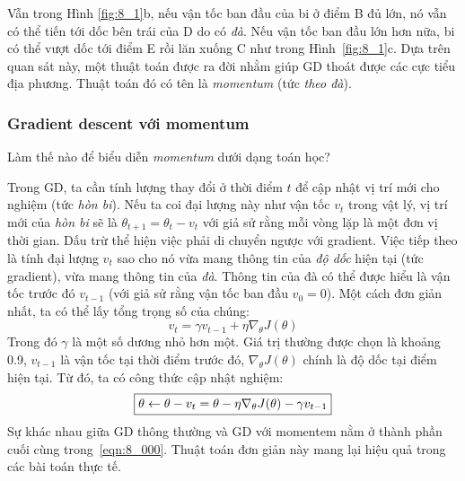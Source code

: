 Vẫn trong Hình \ref{fig:8_1}b, nếu vận tốc ban đầu của bi ở điểm B đủ lớn, nó
vẫn có thể tiến tới dốc bên trái của D do có \textit{đà}. Nếu vận tốc
ban đầu lớn hơn nữa, bi có thể vượt dốc tới điểm E rồi lăn xuống C như trong
Hình~\ref{fig:8_1}c. Dựa trên quan sát này, một thuật toán được ra đời nhằm giúp
GD thoát được các cực tiểu địa phương. Thuật toán đó có tên là \textit{momentum}
(tức \textit{theo đà}).

\subsubsection{Gradient descent với momentum}
Làm thế nào để biểu diễn \textit{momentum} dưới dạng toán học?

Trong GD, ta cần tính lượng thay đổi ở thời điểm $t$ để cập nhật vị trí
mới cho nghiệm (tức \textit{hòn bi}). Nếu ta coi đại lượng này như vận tốc
$v_t$ trong vật lý, vị trí mới của \textit{hòn bi} sẽ là $\theta_{t+1} =
\theta_{t} - v_t$ với giả sử rằng mỗi vòng lặp là một đơn vị thời gian. Dấu trừ
thể hiện việc phải di chuyển ngược với gradient. Việc tiếp theo là tính đại lượng
$v_t$ sao cho nó vừa mang thông tin của \textit{độ dốc} hiện tại (tức gradient),
vừa mang thông tin của \textit{đà}. Thông tin của đà có thể được hiểu là vận tốc
trước đó $v_{t-1}$ (với giả sử rằng vận tốc ban đầu $v_0=0$). Một cách đơn giản
nhất, ta có thể lấy tổng trọng số của chúng:
\begin{equation}
\boxed{v_{t}= \gamma v_{t-1} + \eta \nabla_{\theta}J(\theta)}
\end{equation}
Trong đó $\gamma$ là một số dương nhỏ hơn một. Giá trị thường được chọn là khoảng 0.9, $v_{t-1}$ là vận tốc tại thời điểm trước đó, $ \nabla_{\theta}J(\theta)$ chính là độ dốc tại điểm hiện tại. Từ đó, ta có công thức cập nhật nghiệm:
\begin{equation}
\label{eqn:8_000}
\boxed{\theta \leftarrow \theta - v_t = \theta  - \eta \nabla_{\theta}J(\theta)- \gamma
v_{t-1}}
\end{equation}
Sự khác nhau giữa GD thông thường và GD với momentem nằm ở thành phần cuối
cùng trong~\eqref{eqn:8_000}. Thuật toán đơn giản này mang lại hiệu quả trong
các bài toán thực tế. %

